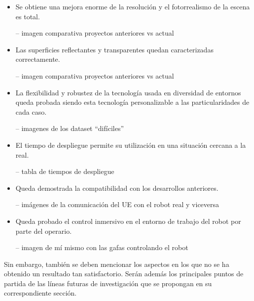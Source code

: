\documentclass[a4paper, 12pt, spanish, twoside]{article}
\begin{document}
\begin{itemize} 

\item Se obtiene una mejora enorme de la resolución y el fotorrealismo de la escena es total.  

-- imagen comparativa proyectos anteriores vs actual 

\item Las superficies reflectantes y transparentes quedan caracterizadas correctamente. 

-- imagen comparativa proyectos anteriores vs actual 

\item La flexibilidad y robustez de la tecnología usada en diversidad de entornos queda probada siendo esta tecnología personalizable a las particularidades de cada caso. 

-- imagenes de los dataset “difíciles” 

\item El tiempo de despliegue permite su utilización en una situación cercana a la real. 

-- tabla de tiempos de despliegue 

\item Queda demostrada la compatibilidad con los desarrollos anteriores. 

-- imágenes de la comunicación del UE con el robot real y viceversa 

\item Queda probado el control inmersivo en el entorno de trabajo del robot por parte del operario. 

-- imagen de mí mismo con las gafas controlando el robot 

\end{itemize} 

Sin embargo, también se deben mencionar los aspectos en los que no se ha obtenido un resultado tan satisfactorio. Serán además los principales puntos de partida de las líneas futuras de investigación que se propongan en su correspondiente sección. 
\end{document}
